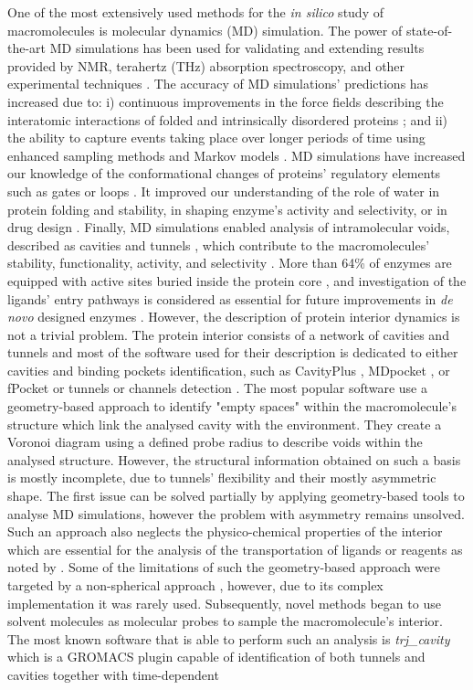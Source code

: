 \documentclass[9pt,tutorial, pubversion]{livecoms}
\begin{document}
One of the most extensively used methods for the \textit{in silico} study of macromolecules is  molecular dynamics (MD) simulation. The power of state-of-the-art MD simulations has been used for validating and extending results provided by NMR, terahertz (THz) absorption spectroscopy, and other experimental techniques \cite{Bottaro2018}. The accuracy of MD simulations’ predictions has increased due to:  i) continuous improvements in the force fields describing the interatomic interactions of folded and intrinsically disordered proteins \cite{Huang2017}; and ii) the ability to capture events taking place over longer periods of time using enhanced sampling methods \cite{Bernardi2015} and Markov models \cite{Husic2018}. MD simulations have increased our knowledge of the conformational changes of proteins’ regulatory elements such as gates \cite{Gora2013} or loops \cite{Kress2018}. It improved our understanding of the role of water in protein folding and stability, in shaping enzyme’s activity and selectivity, or in drug design \cite{Mondal2017,Spyrakis2017}. Finally, MD simulations enabled analysis of intramolecular voids, described as cavities \cite{Stank2016} and tunnels \cite{Kingsley2015,Marques2016}, which contribute to the macromolecules’ stability, functionality, activity, and selectivity \cite{Kokkonen2019}. More than 64\% of enzymes are equipped with active sites buried inside the protein core \cite{Pravda2014}, and investigation of the ligands’ entry pathways is considered as essential for future improvements in \textit{de novo} designed enzymes \cite{Huang2016}. However, the description of protein interior dynamics is not a trivial problem. The protein interior consists of a network of cavities and tunnels and most of the software used for their description is dedicated to either cavities and binding pockets identification, such as CavityPlus \cite{Xu2018}, MDpocket \cite{Schmidtke2011}, or fPocket \cite{Guilloux2009} or tunnels or channels detection \cite{Brezovsky2013}. The most popular software use a geometry-based approach to identify "empty spaces" within the macromolecule's structure which link the analysed cavity with the environment. They create a Voronoi diagram using a defined probe radius to describe voids within the analysed structure. However, the structural information obtained on such a basis is mostly incomplete, due to tunnels’ flexibility and their mostly asymmetric shape. The first issue can be solved partially by applying geometry-based tools to analyse MD simulations, however the problem with asymmetry remains unsolved. Such an approach also neglects the physico-chemical properties of the interior which are essential for the analysis of the transportation of ligands or reagents as noted by \cite{Kaushik2018}. Some of the limitations of such the geometry-based approach were targeted by a non-spherical approach \cite{Benkaidali2014}, however, due to its complex implementation it was rarely used. Subsequently, novel methods began to use solvent molecules as molecular probes \cite{Mitusinska2020} to sample the macromolecule's interior. The most known software that is able to perform such an analysis is \textit{trj\_cavity} \cite{Paramo2014} which is a GROMACS plugin capable of identification of both tunnels and cavities together with time-dependent 
\end{document}
